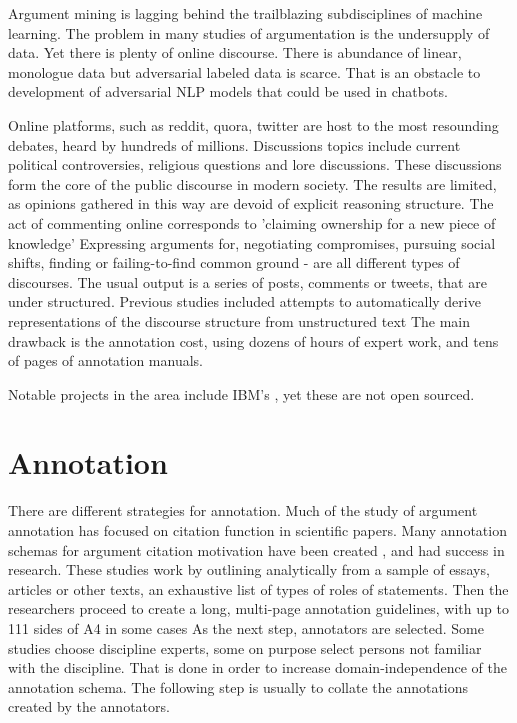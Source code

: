 \documentclass{report}
\begin{document}
Argument mining is lagging behind the trailblazing subdisciplines of machine learning. The problem in many studies of argumentation is the undersupply of data. Yet there is plenty of online discourse.
There is abundance of linear, monologue data but adversarial labeled data is scarce. That is an obstacle to development of adversarial NLP models that could be used in chatbots. 

Online platforms, such as reddit, quora, twitter are host to the most resounding debates, heard by hundreds of millions.  Discussions topics include current political controversies, religious questions and lore discussions. These discussions form the core of the public discourse in modern society.  The results are limited, as opinions gathered in this way are devoid of explicit reasoning structure.  The act of commenting online corresponds to 'claiming ownership for a new piece of knowledge' \cite{teufel_scientific_2014} Expressing arguments for, negotiating compromises, pursuing social shifts, finding or failing-to-find common ground - are all different types of discourses. The usual output is a series of posts, comments or tweets, that are under structured. 
Previous studies included attempts to automatically derive representations of the discourse structure from unstructured text \cite{abbott_how_2011}
The main drawback is the annotation cost, using dozens of hours of expert work, and tens of pages of annotation manuals.

Notable projects in the area include IBM's \cite{slonim_autonomous_2021}, yet these are not open sourced.

\section{Annotation}
There are different strategies for annotation. Much of the study of argument annotation has focused on citation function in scientific papers.
Many annotation schemas for argument citation motivation have been created \cite{teufel_scientific_2014}, \cite{mann_rhetorical_1987} and had success in research.
These studies work by outlining analytically from a sample of essays, articles or other texts, an exhaustive list of types of roles of statements.
Then the researchers proceed to create a long, multi-page annotation guidelines, with up to 111 sides of A4 in some cases \cite{teufel_towards_2009}
As the next step, annotators are selected. Some studies choose discipline experts, some on purpose select persons not familiar with the discipline.
That is done in order to increase domain-independence of the annotation schema.
The following step is usually to collate the annotations created by the annotators. 
\end{document}
